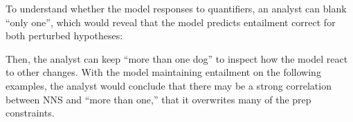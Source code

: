To understand whether the model responses to quantifiers, an analyst can blank ``only one'', which would reveal that the model predicts entailment correct for both perturbed hypotheses:


Then, the analyst can keep ``more than one dog'' to inspect how the model react to other changes. 
With the model maintaining entailment on the following examples, the analyst would conclude that there may be a strong correlation between NNS and ``more than one,'' that it overwrites many of the prep constraints.


